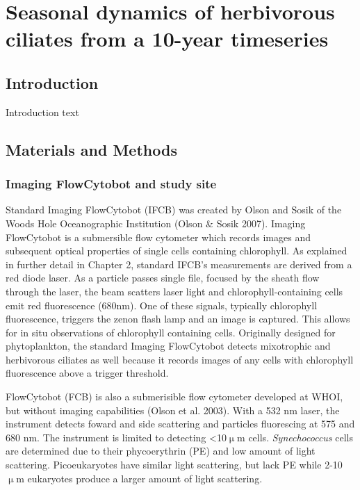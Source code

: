 

\chapter{Seasonal dynamics of herbivorous ciliates from a 10-year timeseries}

\section{Introduction}

Introduction text

\section{Materials and Methods}

\subsection{Imaging FlowCytobot and study site }

Standard Imaging FlowCytobot (IFCB) was created by Olson and Sosik of the Woods Hole Oceanographic Institution (Olson \& Sosik 2007). Imaging FlowCytobot is a submersible flow cytometer which records images and subsequent optical properties of single cells containing chlorophyll. As explained in further detail in Chapter 2, standard IFCB's measurements are derived from a red diode laser. As a particle passes single file, focused by the sheath flow through the laser, the beam scatters laser light and chlorophyll-containing cells emit red fluorescence (680nm).  One of these signals, typically chlorophyll fluorescence, triggers the zenon flash lamp and an image is captured. This allows for in situ observations of chlorophyll containing cells. Originally designed for phytoplankton, the standard Imaging FlowCytobot detects mixotrophic and herbivorous ciliates as well because it records images of any cells with chlorophyll fluorescence above a trigger threshold. 

FlowCytobot (FCB) is also a submerisible flow cytometer developed at WHOI, but without imaging capabilities (Olson et al. 2003). With a 532 nm laser, the instrument detects foward and side scattering and particles fluorescing at 575 and 680 nm. The instrument is limited to detecting <10$\upmu$m cells. \textit{Synechococcus} cells are determined due to their phycoerythrin (PE) and low amount of light scattering. Picoeukaryotes have similar light scattering, but lack PE while 2-10 $\upmu$m eukaryotes produce a larger amount of light scattering. 


